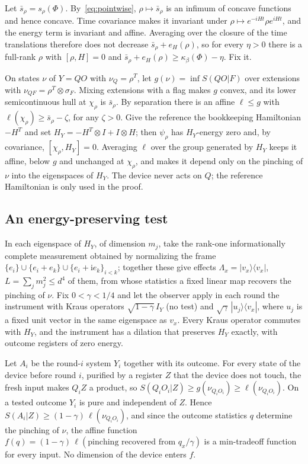 \documentclass[11pt]{article}
\theoremstyle{definition}
\theoremstyle{remark}
\newcommand{\Trt}{\kappa_\beta}
\begin{document}
Let $\bar s_\rho=s_\rho(\Phi)$. By~\eqref{eq:pointwise}, $\rho\mapsto\bar s_\rho$ is an infimum of concave functions and hence concave. Time covariance makes it invariant under $\rho\mapsto e^{-iHt}\rho e^{iHt}$, and the energy term is invariant and affine. Averaging over the closure of the time translations therefore does not decrease $\bar s_\rho+e_H(\rho)$, so for every $\eta>0$ there is a full-rank $\rho$ with $[\rho,H]=0$ and $\bar s_\rho+e_H(\rho)\ge\Trt(\Phi)-\eta$. Fix it.

On states $\nu$ of $Y=QO$ with $\nu_Q=\rho^T$, let $g(\nu)=\inf S(QO|F)$ over extensions with $\nu_{QF}=\rho^T\otimes\sigma_F$. Mixing extensions with a flag makes $g$ convex, and its lower semicontinuous hull at $\chi_\rho$ is $\bar s_\rho$. By separation there is an affine $\ell\le g$ with $\ell(\chi_\rho)\ge\bar s_\rho-\zeta$, for any $\zeta>0$. Give the reference the bookkeeping Hamiltonian $-H^T$ and set $H_Y=-H^T\otimes I+I\otimes H$; then $\psi_\rho$ has $H_Y$-energy zero and, by covariance, $[\chi_\rho,H_Y]=0$. Averaging $\ell$ over the group generated by $H_Y$ keeps it affine, below $g$ and unchanged at $\chi_\rho$, and makes it depend only on the pinching of $\nu$ into the eigenspaces of $H_Y$. The device never acts on $Q$; the reference Hamiltonian is only used in the proof.

\subsection{An energy-preserving test}

In each eigenspace of $H_Y$, of dimension $m_j$, take the rank-one informationally complete measurement obtained by normalizing the frame $\{e_i\}\cup\{e_i+e_k\}\cup\{e_i+\mathrm ie_k\}_{i<k}$; together these give effects $\Lambda_x=|v_x\rangle\langle v_x|$, $L=\sum_jm_j^2\le d^4$ of them, from whose statistics a fixed linear map recovers the pinching of $\nu$. Fix $0<\gamma<1/4$ and let the observer apply in each round the instrument with Kraus operators $\sqrt{1-\gamma}\,I_Y$ (no test) and $\sqrt\gamma\,|u_j\rangle\langle v_x|$, where $u_j$ is a fixed unit vector in the same eigenspace as $v_x$. Every Kraus operator commutes with $H_Y$, and the instrument has a dilation that preserves $H_Y$ exactly, with outcome registers of zero energy.

Let $A_i$ be the round-$i$ system $Y_i$ together with its outcome. For every state of the device before round $i$, purified by a register $Z$ that the device does not touch, the fresh input makes $Q_iZ$ a product, so $S(Q_iO_i|Z)\ge g(\nu_{Q_iO_i})\ge\ell(\nu_{Q_iO_i})$. On a tested outcome $Y_i$ is pure and independent of $Z$. Hence $S(A_i|Z)\ge(1-\gamma)\,\ell(\nu_{Q_iO_i})$, and since the outcome statistics $q$ determine the pinching of $\nu$, the affine function $f(q)=(1-\gamma)\,\ell(\text{pinching recovered from }q_x/\gamma)$ is a min-tradeoff function for every input. No dimension of the device enters $f$.
\end{document}
